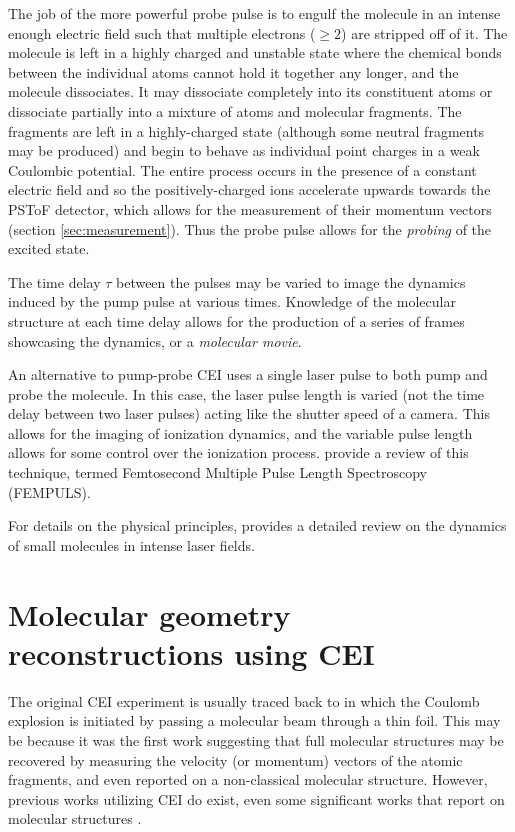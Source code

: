 The job of the more powerful probe pulse is to engulf the molecule in an intense enough electric field such that multiple electrons ($\ge2$) are stripped off of it. The molecule is left in a highly charged and unstable state where the chemical bonds between the individual atoms cannot hold it together any longer, and the molecule dissociates. It may dissociate completely into its constituent atoms or dissociate partially into a mixture of atoms and molecular fragments. The fragments are left in a highly-charged state (although some neutral fragments may be produced) and begin to behave as individual point charges in a weak Coulombic potential. The entire process occurs in the presence of a constant electric field and so the positively-charged ions accelerate upwards towards the PSToF detector, which allows for the measurement of their momentum vectors (section \ref{sec:measurement}). Thus the probe pulse allows for the \emph{probing} of the excited state.

The time delay $\tau$ between the pulses may be varied to image the dynamics induced by the pump pulse at various times. Knowledge of the molecular structure at each time delay allows for the production of a series of frames showcasing the dynamics, or a \emph{molecular movie}.

An alternative to pump-probe CEI uses a single laser pulse to both pump and probe the molecule. In this case, the laser pulse length is varied (not the time delay between two laser pulses) acting like the shutter speed of a camera. This allows for the imaging of ionization dynamics, and the variable pulse length allows for some control over the ionization process.  \citet{Karimi16ch} provide a review of this technique, termed Femtosecond Multiple Pulse Length Spectroscopy (FEMPULS).

For details on the physical principles, \citet{Posthumus04} provides a detailed review on the dynamics of small molecules in intense laser fields.

\section{Molecular geometry reconstructions using CEI}
The original CEI experiment is usually traced back to \citet{Vager89} in which the Coulomb explosion is initiated by passing a molecular beam through a thin foil. This may be because it was the first work suggesting that full molecular structures may be recovered by measuring the velocity (or momentum) vectors of the atomic fragments, and even reported on a non-classical molecular structure. However, previous works utilizing CEI do exist, even some significant works that report on molecular structures \citep{Kanter79}.

